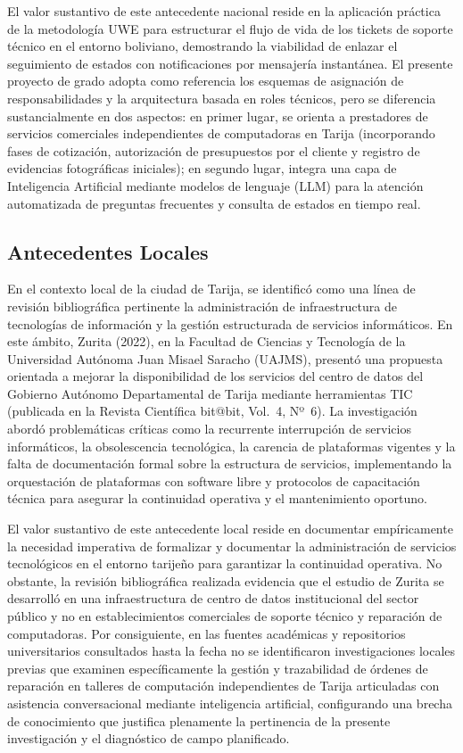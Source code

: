 El valor sustantivo de este antecedente nacional reside en la aplicación práctica de la metodología UWE para estructurar el flujo de vida de los tickets de soporte técnico en el entorno boliviano, demostrando la viabilidad de enlazar el seguimiento de estados con notificaciones por mensajería instantánea. El presente proyecto de grado adopta como referencia los esquemas de asignación de responsabilidades y la arquitectura basada en roles técnicos, pero se diferencia sustancialmente en dos aspectos: en primer lugar, se orienta a prestadores de servicios comerciales independientes de computadoras en Tarija (incorporando fases de cotización, autorización de presupuestos por el cliente y registro de evidencias fotográficas iniciales); en segundo lugar, integra una capa de Inteligencia Artificial mediante modelos de lenguaje (LLM) para la atención automatizada de preguntas frecuentes y consulta de estados en tiempo real.

\subsection{Antecedentes Locales}

En el contexto local de la ciudad de Tarija, se identificó como una línea de revisión bibliográfica pertinente la administración de infraestructura de tecnologías de información y la gestión estructurada de servicios informáticos. En este ámbito, Zurita (2022), en la Facultad de Ciencias y Tecnología de la Universidad Autónoma Juan Misael Saracho (UAJMS), presentó una propuesta orientada a mejorar la disponibilidad de los servicios del centro de datos del Gobierno Autónomo Departamental de Tarija mediante herramientas TIC (publicada en la Revista Científica bit@bit, Vol.~4, Nº~6). La investigación abordó problemáticas críticas como la recurrente interrupción de servicios informáticos, la obsolescencia tecnológica, la carencia de plataformas vigentes y la falta de documentación formal sobre la estructura de servicios, implementando la orquestación de plataformas con software libre y protocolos de capacitación técnica para asegurar la continuidad operativa y el mantenimiento oportuno.

El valor sustantivo de este antecedente local reside en documentar empíricamente la necesidad imperativa de formalizar y documentar la administración de servicios tecnológicos en el entorno tarijeño para garantizar la continuidad operativa. No obstante, la revisión bibliográfica realizada evidencia que el estudio de Zurita se desarrolló en una infraestructura de centro de datos institucional del sector público y no en establecimientos comerciales de soporte técnico y reparación de computadoras. Por consiguiente, en las fuentes académicas y repositorios universitarios consultados hasta la fecha no se identificaron investigaciones locales previas que examinen específicamente la gestión y trazabilidad de órdenes de reparación en talleres de computación independientes de Tarija articuladas con asistencia conversacional mediante inteligencia artificial, configurando una brecha de conocimiento que justifica plenamente la pertinencia de la presente investigación y el diagnóstico de campo planificado.

